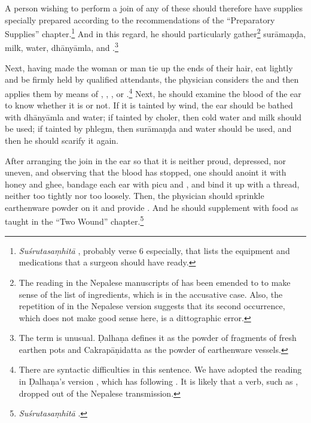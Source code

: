 \begin{translation}
A person wishing to perform a join of any of these should therefore have
supplies specially prepared according to the recommendations of the
“Preparatory Supplies” chapter.\footnote{\emph{Suśrutasaṃhitā}
    , probably verse 6 especially, that lists the equipment and
    medications that a surgeon should have ready.}  And in this regard, he should
    particularly gather\footnote{The reading in the Nepalese manuscripts of
         has been emended to
         to make sense of the list of ingredients, which is
        in the accusative case. Also, the repetition of  in the
        Nepalese version suggests that its second occurrence, which does not make good
        sense here, is a dittographic error.} \gls{surāmaṇḍa}, milk,
        water, \gls{dhānyāmla}, and
        .\footnote{The term
             is unusual. Ḍalhaṇa \citep[79]{vulgate} defines it as the
            powder of fragments of fresh earthen pots and Cakrapāṇidatta
            \citep[129]{acar-1939} as the powder of earthenware vessels.}
    
Next, having made the woman or man tie up the ends of their hair, eat lightly
and be firmly held by qualified attendants, the physician considers the
 and then applies them by means of
, ,
, or
.\footnote{There are syntactic difficulties in
    this sentence.  We have %
    adopted the reading in Ḍalhaṇa's version \citep[78]{vulgate}, which has
     following . It is likely that a verb,
    such as , dropped out of the Nepalese transmission.}  Next, he
    should examine the blood of the ear to know whether it is
     or not. If it is tainted by wind, the ear
    should be bathed with \gls{dhānyāmla} and water; if tainted by choler,
    then cold water and milk should be used; if tainted by phlegm, then
    \gls{surāmaṇḍa} and water should be used, and then he should scarify it
    again.
       
After arranging the join in the ear so that it is neither proud, depressed, nor
uneven, and observing that the blood has stopped, one should anoint it with
honey and ghee, bandage each ear with \gls{picu} and 
, and
bind it up with a thread, neither too tightly nor too loosely.  Then, the
physician should sprinkle earthenware powder on it and  provide
. And he should supplement with food as taught in  the
“Two Wound” chapter.\footnote{\emph{Suśrutasaṃhitā} .}
    

\end{translation}
